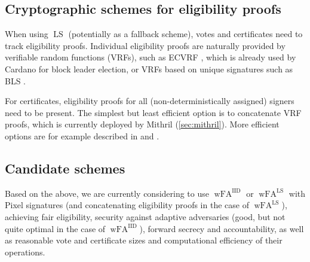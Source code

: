 \subsection{Cryptographic schemes for eligibility proofs}\label{sec:eligibility proofs}

When using $\operatorname{LS}$ (potentially as a fallback scheme), votes and certificates need to track eligibility proofs.
Individual eligibility proofs are naturally provided by verifiable random functions (VRFs), such as ECVRF \parencite{goldberg2023vrf_rfc9381}, which is already used by Cardano for block leader election, or VRFs based on unique signatures such as BLS \parencite{boneh2004short}.

For certificates, eligibility proofs for all (non-deterministically assigned) signers need to be present.
The simplest but least efficient option is to concatenate VRF proofs, which is currently deployed by Mithril (\cref{sec:mithril}).
More efficient options are for example described in \cite[Section 5.3]{chaidos2024mithril} and \cite{fleischhacker2024jackpot}.

\subsection{Candidate schemes}

Based on the above, we are currently considering to use $\operatorname{wFA}^{\operatorname{IID}}$ or $\operatorname{wFA}^{\operatorname{LS}}$ with Pixel signatures (and concatenating eligibility proofs in the case of $\operatorname{wFA}^{\operatorname{LS}}$), achieving fair eligibility, security against adaptive adversaries (good, but not quite optimal in the case of $\operatorname{wFA}^{\operatorname{IID}}$), forward secrecy and accountability, as well as reasonable vote and certificate sizes and computational efficiency of their operations.

